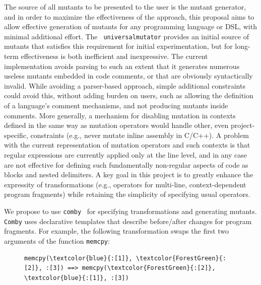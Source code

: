 The source of all mutants to be presented to the user is the mutant
generator, and in order to maximize the effectiveness of the approach,
this proposal aims to allow effective generation of mutants for any
programming
language or DSL, with minimal additional effort.  The {\tt
  universalmutator} provides an initial source of mutants that
satisfies this requirement for initial experimentation, but for
long-term effectiveness is both inefficient and inexpressive.  The
current implementation avoids parsing to such an extent that it
generates numerous useless mutants embedded in code comments, or that
are obviously syntactically invalid.  While avoiding a parser-based
approach, simple additional constraints could avoid this, without
adding burden on users, such as allowing the definition of a
language's comment mechanisms, and not producing mutants inside
comments.  More generally, a mechanism for disabling mutation in
contexts defined in the same way as mutation operators would handle
other, even project-specific, constraints (e.g., never mutate inline
assembly in C/C++).  A problem with the current representation of
mutation operators and such contexts is that regular expressions are
currently applied only at the line level, and in any case are not
effective for defining such fundamentally non-regular aspects of code
as blocks and nested delimiters.  A key goal in this project is to greatly
enhance
the expressity of transformations (e.g., operators for multi-line, context-dependent program fragments) while retaining the simplicity of specifying usual %
operators.

We propose to use {\tt comby}~\cite{comby-github, rvt-ppc} for specifying
transformations and generating mutants. {\tt Comby} uses
declarative templates that describe before/after changes for program fragments. For example, the following transformation swaps the first two arguments of the function {\tt memcpy}:

\begin{figure}[!h]
\centering
\begin{BVerbatim}[commandchars=\\\{\}]
memcpy(\textcolor{blue}{:[1]}, \textcolor{ForestGreen}{:[2]}, :[3]) ==> memcpy(\textcolor{ForestGreen}{:[2]}, \textcolor{blue}{:[1]}, :[3])
\end{BVerbatim}
\end{figure}

